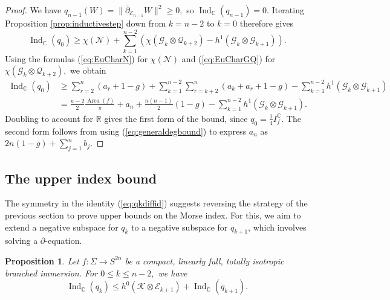 \documentclass[11pt]{article}
\newtheorem{prop}[theorem]{Proposition}
\theoremstyle{definition}
\newcommand{\R}{\mathbb{R}}
\newcommand{\C}{\mathbb{C}}
\newcommand{\del}{\partial}
\newcommand{\delbar}{\overline{\partial}}
\numberwithin{equation}{section}
\begin{document}
\begin{proof}
	We have $q_{n-1}(W) = \lVert \delbar_{\mathcal{E}_{n-1}} W \rVert^2 \geq 0,$ so $\operatorname{Ind}_\C(q_{n-1}) = 0.$  Iterating Proposition \ref{prop:inductivestep} down from $k = n-2$ to $k=0$ therefore gives
	\begin{equation*}
		\operatorname{Ind}_{\C}(q_0) \geq \chi(\mathcal{N}) + \sum_{k=1}^{n-2} \left( \chi(\mathcal{G}_k \otimes \mathcal{Q}_{k+2}) - h^1(\mathcal{G}_k \otimes \mathcal{G}_{k+1}) \right).
	\end{equation*}
	Using the formulas (\ref{eq:EuCharN}) for $\chi(\mathcal{N})$ and (\ref{eq:EuCharGQ}) for $\chi(\mathcal{G}_k \otimes \mathcal{Q}_{k+2}),$ we obtain
	\begin{equation*}
		\begin{aligned}
			\operatorname{Ind}_{\C}(q_0) & \geq \sum_{r=2}^n(a_r+1-g) + \sum_{k=1}^{n-2} \sum_{r=k+2}^{n}(a_k + a_r + 1 -g) - \sum_{k=1}^{n-2} h^1(\mathcal{G}_k \otimes \mathcal{G}_{k+1}) \\
			                             & = \frac{n-2}{2} \frac{\operatorname{Area}(f)}{\pi} + a_n + \frac{n(n-1)}{2}(1-g) - \sum_{k=1}^{n-2} h^1(\mathcal{G}_k \otimes \mathcal{G}_{k+1}). 
		\end{aligned}
	\end{equation*}
	Doubling to account for $\R$ gives the first form of the bound, since $q_0 = \tfrac{1}{4} I^\C_f.$ The second form follows from using (\ref{eq:generaldegbound}) to express $a_n$ as $2n(1-g) + \sum_{j=1}^n b_j.$
\end{proof}

\subsection{The upper index bound}

\indent \indent The symmetry in the identity (\ref{eq:qkdiffid}) suggests reversing the strategy of the previous section to prove upper bounds on the Morse index. For this, we aim to extend a negative subspace for $q_{k}$ to a negative subspace for $q_{k+1}$, which involves solving a $\del$-equation.

\begin{prop}\label{prop:upperbound}
	Let $f: \Sigma \to S^{2n}$ be a compact, linearly full, totally isotropic branched immersion. For $0 \leq k \leq n-2,$ we have
	\begin{equation*}
		\operatorname{Ind}_\C(q_{k}) \leq h^0(\mathcal{K} \otimes \mathcal{E}_{k+1}) + \operatorname{Ind}_\C(q_{k+1}).
	\end{equation*}
\end{prop}
\end{document}
